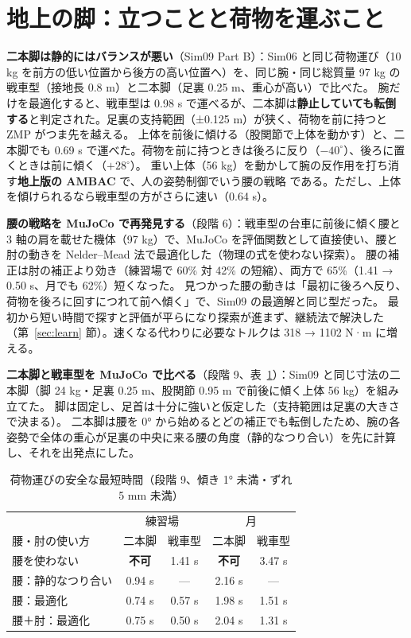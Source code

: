 \documentclass[paper=a4paper,fontsize=10pt,twocolumn,column_gap=2zw,line_length=24zw,number_of_lines=46,head_space=20mm]{jlreq}
\begin{document}
\section{地上の脚：立つことと荷物を運ぶこと}\label{sec:legground}

\textbf{二本脚は静的にはバランスが悪い}（Sim09 Part B）：Sim06 と同じ荷物運び（10 kg を前方の低い位置から後方の高い位置へ）を、同じ腕・同じ総質量 97 kg の戦車型（接地長 0.8 m）と二本脚（足裏 0.25 m、重心が高い）で比べた。
腕だけを最適化すると、戦車型は 0.98 s で運べるが、二本脚は\textbf{静止していても転倒する}と判定された。足裏の支持範囲（±0.125 m）が狭く、荷物を前に持つと ZMP がつま先を越える。
上体を前後に傾ける（股関節で上体を動かす）と、二本脚でも 0.69 s で運べた。荷物を前に持つときは後ろに反り（$-40^\circ$）、後ろに置くときは前に傾く（$+28^\circ$）。
重い上体（56 kg）を動かして腕の反作用を打ち消す\textbf{地上版の AMBAC} で、人の姿勢制御でいう腰の戦略 \cite{horak1986} である。ただし、上体を傾けられるなら戦車型の方がさらに速い（0.64 s）。

\textbf{腰の戦略を MuJoCo で再発見する}（段階 6）：戦車型の台車に前後に傾く腰と 3 軸の肩を載せた機体（97 kg）で、MuJoCo を評価関数として直接使い、腰と肘の動きを Nelder--Mead 法で最適化した（物理の式を使わない探索）。
腰の補正は肘の補正より効き（練習場で 60\% 対 42\% の短縮）、両方で 65\%（1.41 → 0.50 s、月でも 62\%）短くなった。
見つかった腰の動きは「最初に後ろへ反り、荷物を後ろに回すにつれて前へ傾く」で、Sim09 の最適解と同じ型だった。
最初から短い時間で探すと評価が平らになり探索が進まず、継続法で解決した（第~\ref{sec:learn} 節）。速くなる代わりに必要なトルクは 318 → 1102 N·m に増える。

\textbf{二本脚と戦車型を MuJoCo で比べる}（段階 9、表~\ref{tab:biped}）：Sim09 と同じ寸法の二本脚（脚 24 kg・足裏 0.25 m、股関節 0.95 m で前後に傾く上体 56 kg）を組み立てた。
脚は固定し、足首は十分に強いと仮定した（支持範囲は足裏の大きさで決まる）。
二本脚は腰を 0° から始めるとどの補正でも転倒したため、腕の各姿勢で全体の重心が足裏の中央に来る腰の角度（静的なつり合い）を先に計算し、それを出発点にした。

\begin{table}[t]\centering\small
\caption{荷物運びの安全な最短時間（段階 9、傾き 1° 未満・ずれ 5 mm 未満）}\label{tab:biped}
\setlength{\tabcolsep}{3pt}
\begin{tabular}{lcccc}\toprule
 & \multicolumn{2}{c}{練習場} & \multicolumn{2}{c}{月} \\
腰・肘の使い方 & 二本脚 & 戦車型 & 二本脚 & 戦車型 \\\midrule
腰を使わない & \textbf{不可} & 1.41 s & \textbf{不可} & 3.47 s \\
腰：静的なつり合い & 0.94 s & --- & 2.16 s & --- \\
腰：最適化 & 0.74 s & 0.57 s & 1.98 s & 1.51 s \\
腰＋肘：最適化 & 0.75 s & 0.50 s & 2.04 s & 1.31 s \\\bottomrule
\end{tabular}
\end{table}
\end{document}
